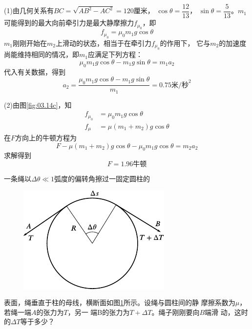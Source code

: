 (1)由几何关系有$  B C = \sqrt { A B ^ { 2 } - A C ^ { 2 } } = 1 2 0  $厘米，
$ \cos \theta = \dfrac { 1 2 } { 1 3 } $，
$ \sin \theta = \dfrac { 5 } { 1 3 } $。$ m _ { 1 }  $
可能得到的最大向前牵引力是最大静摩擦力$  f _ { \mu _ 0 }  $，即
\clearpage
~\vspace{-1.56em}
\begin{equation*}
  f _ {\mu _ 0 } = \mu _ { 0 } m _ { 1 } g \cos \theta
\end{equation*}
$m_1$刚刚开始在$m_2$上滑动的状态，相当于在牵引力$ f _{\mu _ 0} $的作用下，
它与$m_2$的加速度尚能维持相同的情况，即$m_1$应满足下列方程：
\begin{equation*}
  \mu _ { 0 } m _ { 1 } g \cos \theta - m _ { 1 } g \sin \theta = m _ { 1 } a _ { 2 }
\end{equation*}
代入有关数据，得到
\begin{equation*}
  a _ { 2 } = \frac { \mu_{ 0 } m_1 g \cos \theta - m _ { 1 } g \sin \theta } { m _ { 1 } } = 0 . 7 5 \text{米/秒}^2
\end{equation*}

(2)由图\ref{fig:03.14c}，知
\begin{align*}
  f _ { \mu _ 0 } & = \mu _ { 0 } m _ { 1 } g \cos \theta                    \\
  f _ { \mu }     & = \mu \left( m _ { 1 } + m _ { 2 } \right) g \cos \theta
\end{align*}
在$ F $方向上的牛顿方程为
\begin{equation*}
  F - \mu \left( m _ { 1 } + m _ { 2 } \right) g \cos \theta - \mu _ { 0 } m _ { 1 } g \cos \theta = m _ { 2 } a _ { 2 }
\end{equation*}
求解得到\vspace{-1.56em}
\begin{equation*}
  F = 1 . 9 6 \text{牛顿}
\end{equation*}

\example 一条绳以$  \Delta \theta \ll 1  $弧度的偏转角擦过一固定圆柱的
\begin{figure}
  \centering
  \includegraphics{figure/fig03.15}
  \caption{}
  \label{fig:03.15}
\end{figure}
表面，绳垂直于柱的母线，横断面如图\ref{fig:03.15}\;所示。设绳与圆柱间的静
摩擦系数为$\mu$，若绳一端$ A $的张力为$ T $，另一
端B的张力为$  T + \Delta T $。绳子刚刚要向$ B $端滑
动，这时的$  \Delta T  $等于多少？

